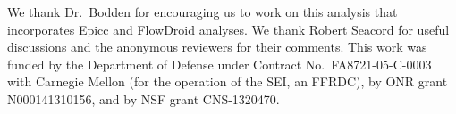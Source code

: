 \begin{acknowledgments}
We thank Dr.\ Bodden for encouraging us to work on this analysis that
incorporates Epicc and FlowDroid analyses.  We thank Robert Seacord for useful discussions and the anonymous reviewers for their comments.
This work was funded by the Department of Defense under 
Contract No.\ FA8721-05-C-0003 with Carnegie Mellon (for the
operation of the SEI, an FFRDC),
by ONR grant N000141310156, and by NSF grant CNS-1320470.
\end{acknowledgments}
